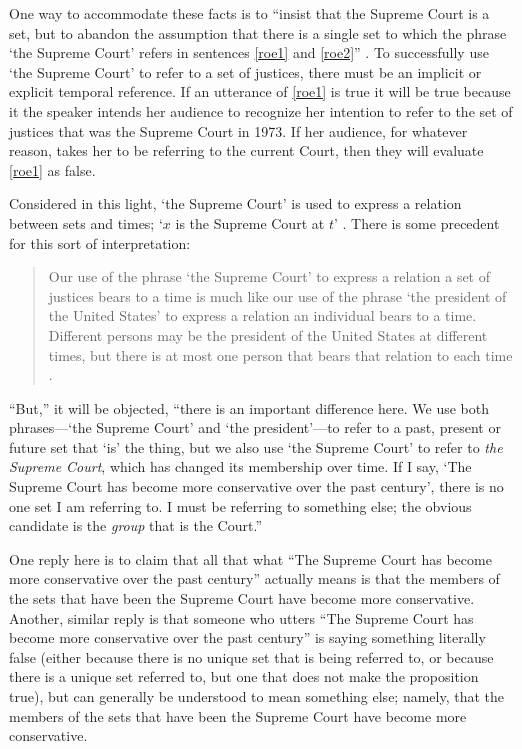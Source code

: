 \documentclass[12pt,twoside]{reedfancy}
\begin{document}
\begin{spacing}{1.25}
One way to accommodate these facts is to ``insist that the Supreme
Court is a set, but to abandon the assumption that there is a single
set to which the phrase `the Supreme Court' refers in sentences
\ref{roe1} and \ref{roe2}'' \citep[138]{uzquiano2004a}.  To
successfully use `the Supreme Court' to refer to a set of justices,
there must be an implicit or explicit temporal reference.  If an
utterance of \ref{roe1} is true it will be true because it the speaker
intends her audience to recognize her intention to refer to the set of
justices that was the Supreme Court in 1973.  If her audience, for
whatever reason, takes her to be referring to the current Court, then
they will evaluate \ref{roe1} as false.

Considered in this light, `the Supreme Court' is used to express a
relation between sets and times; `$x$ is the Supreme Court at $t$'
\citep[140]{uzquiano2004a}.  There is some precedent for this sort of
interpretation:

\begin{quote}
Our use of the phrase `the Supreme Court' to express a relation a set
of justices bears to a time is much like our use of the phrase `the
president of the United States' to express a relation an individual
bears to a time.  Different persons may be the president of the United
States at different times, but there is at most one person that bears
that relation to each time \citep[138]{uzquiano2004a}.
\end{quote}

``But,'' it will be objected, ``there is an important difference here.
We use both phrases---`the Supreme Court' and `the president'---to
refer to a past, present or future set that `is' the thing, but we
also use `the Supreme Court' to refer to {\em the Supreme Court},
which has changed its membership over time.  If I say, `The Supreme
Court has become more conservative over the past century', there is no
one set I am referring to.  I must be referring to something else; the
obvious candidate is the {\em group} that is the Court.''

One reply here is to claim that all that what ``The Supreme Court has
become more conservative over the past century'' actually means is
that the members of the sets that have been the Supreme Court have
become more conservative.  Another, similar reply is that someone who
utters ``The Supreme Court has become more conservative over the past
century'' is saying something literally false (either because there is
no unique set that is being referred to, or because there is a unique
set referred to, but one that does not make the proposition true), but
can generally be understood to mean something else; namely, that the
members of the sets that have been the Supreme Court have become more
conservative.


\end{spacing}
\end{document}
